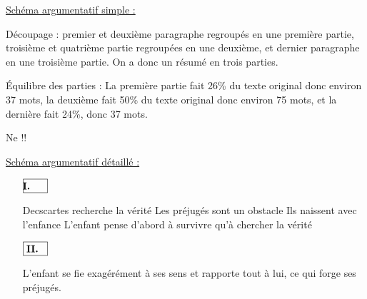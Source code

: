 \documentclass[a4paper,french,bookmarks]{article}
\begin{document}
\underline{Schéma argumentatif simple :}

\begin{enumerate}
    \ithand Découpage : premier et deuxième paragraphe regroupés en une première partie, troisième et quatrième partie regroupées en une deuxième, et dernier paragraphe en une troisième partie. On a donc un résumé en trois parties.
    
    \ithand Équilibre des parties : La première partie fait 26\% du texte original donc environ 37 mots, la deuxième fait 50\% du texte original donc environ 75 mots, et la dernière fait 24\%, donc 37 mots.
\end{enumerate}

\begin{warning}{}{}
    Ne  !!
\end{warning}

\underline{Schéma argumentatif détaillé :}

\begin{enumerate}
    \item[$\boxed{\textbf{\makebox[0pt][c]{\centering I.}\phantom{IIII}}}$] \begin{enumerate}
            \ithand Decscartes recherche la vérité
            \ithand Les préjugés sont un obstacle
            \ithand Ils naissent avec l'enfance
            \ithand L'enfant pense d'abord à survivre qu'à chercher la vérité
        \end{enumerate}
        
        \item[$\boxed{\textbf{\makebox[0pt][l]{\centering II.}\phantom{IIII}}}$] \begin{enumerate}
            \ithand L'enfant se fie exagérément à ses sens et rapporte tout à lui, ce qui forge ses préjugés.
            \ithand 
        \end{enumerate}
\end{enumerate}
\end{document}
